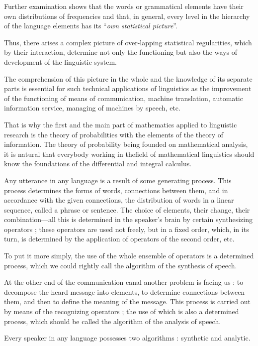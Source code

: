 Further examination shows that the words or grammatical elements have
their own distributions of frequencies and that, in general, every
level in the hierarchy of the language elements has its ``\textit{own
  statistical picture}''.

Thus, there arises a complex picture of over-lapping statistical
regularities, which by their interaction, determine not only the
functioning but also the ways of development of the linguistic system.

The comprehension of this picture in the whole and the knowledge of
its separate parts is essential for such technical applications of
linguistics as the improvement of the functioning of means of
communication, machine translation, automatic information service,
managing of machines by speech, etc.

That is why the first and the main part of mathematics applied to
linguistic research is the theory of probabilities with the elements
of the theory of information. The theory of probability being founded
on mathematical analysis, it is natural that everybody working in
the\pageoriginale field of mathematical linguistics should know the
foundations of the differential and integral calculus.

Any utterance in any language is a result of some generating
process. This process determines the forms of words, connections
between them, and in accordance with the given connections, the
distribution of words in a linear sequence, called a phrase or
sentence. The choice of elements, their change, their
combination---all this is determined in the speaker's brain by certain
synthesizing operators ; these operators are used not freely, but in a
fixed order, which, in its turn, is determined by the application of
operators of the second order, etc.

To put it more simply, the use of the whole ensemble of operators is a
determined process, which we could rightly call the algorithm of the
synthesis of speech.

At the other end of the communication canal another problem is facing
us : to decompose the heard message into elements, to determine
connections between them, and then to define the meaning of the
message. This process is carried out by means of the recognizing
operators ; the use of which is also a  determined process, which
should be called the algorithm of the analysis of speech. 

Every speaker in any language possesses two algorithms : synthetic and
analytic. 

